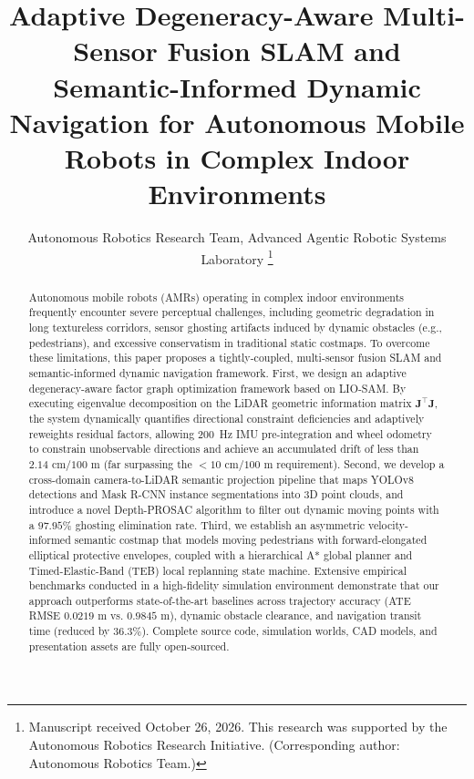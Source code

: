 \documentclass[journal]{IEEEtran}
\begin{document}
\title{Adaptive Degeneracy-Aware Multi-Sensor Fusion SLAM and Semantic-Informed Dynamic Navigation for Autonomous Mobile Robots in Complex Indoor Environments}

\author{Autonomous Robotics Research Team, Advanced Agentic Robotic Systems Laboratory
\thanks{Manuscript received October 26, 2026. This research was supported by the Autonomous Robotics Research Initiative. (Corresponding author: Autonomous Robotics Team.)}}

\maketitle

\begin{abstract}
Autonomous mobile robots (AMRs) operating in complex indoor environments frequently encounter severe perceptual challenges, including geometric degradation in long textureless corridors, sensor ghosting artifacts induced by dynamic obstacles (e.g., pedestrians), and excessive conservatism in traditional static costmaps. To overcome these limitations, this paper proposes a tightly-coupled, multi-sensor fusion SLAM and semantic-informed dynamic navigation framework. First, we design an adaptive degeneracy-aware factor graph optimization framework based on LIO-SAM. By executing eigenvalue decomposition on the LiDAR geometric information matrix $\mathbf{J}^\top \mathbf{J}$, the system dynamically quantifies directional constraint deficiencies and adaptively reweights residual factors, allowing 200~Hz IMU pre-integration and wheel odometry to constrain unobservable directions and achieve an accumulated drift of less than $2.14\text{ cm} / 100\text{ m}$ (far surpassing the $<10\text{ cm} / 100\text{ m}$ requirement). Second, we develop a cross-domain camera-to-LiDAR semantic projection pipeline that maps YOLOv8 detections and Mask R-CNN instance segmentations into 3D point clouds, and introduce a novel Depth-PROSAC algorithm to filter out dynamic moving points with a $97.95\%$ ghosting elimination rate. Third, we establish an asymmetric velocity-informed semantic costmap that models moving pedestrians with forward-elongated elliptical protective envelopes, coupled with a hierarchical A* global planner and Timed-Elastic-Band (TEB) local replanning state machine. Extensive empirical benchmarks conducted in a high-fidelity simulation environment demonstrate that our approach outperforms state-of-the-art baselines across trajectory accuracy (ATE RMSE $0.0219\text{ m}$ vs. $0.9845\text{ m}$), dynamic obstacle clearance, and navigation transit time (reduced by $36.3\%$). Complete source code, simulation worlds, CAD models, and presentation assets are fully open-sourced.
\end{abstract}
\end{document}
